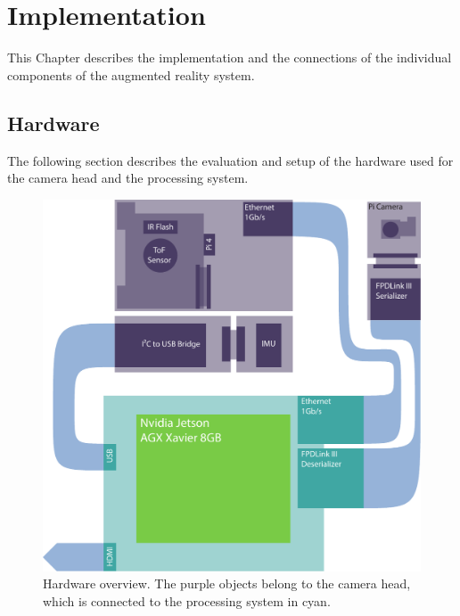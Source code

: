 \chapter{Implementation}
\label{sec:Implementation}
This Chapter describes the implementation and the connections of the individual components of the augmented reality system. 
\section{Hardware}
\label{sec:Hardware}
The following section describes the evaluation and setup of the hardware used for the camera head and the processing system.
\begin{figure}[H]
    \centering
    \includegraphics[width=1.0\textwidth]{images/hardware.pdf}
    \caption{Hardware overview. The purple objects belong to the camera head, which is connected to the processing system in cyan.}
    \label{fig:HW_diagram}
\end{figure}
